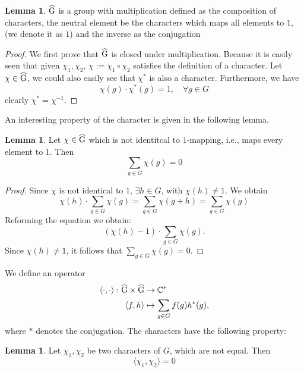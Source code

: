 \documentclass{article}
\theoremstyle{definition}
\newtheorem{lemma}[theorem]{Lemma}
\numberwithin{equation}{theorem}
\numberwithin{figure}{theorem}
\newcommand\reallywidehat[1]{%
\savestack{\tmpbox}{\stretchto{%
  \scaleto{%
    \scalerel*[\widthof{\ensuremath{#1}}]{\kern-.6pt\bigwedge\kern-.6pt}%
    {\rule[-\textheight/2]{1ex}{\textheight}}%
  }{\textheight}%
}{0.5ex}}%
\stackon[1pt]{#1}{\tmpbox}%
}
\newcommand{\ComplexUnit}{\ensuremath{\mathbb{C}^{*}}}
\newcommand{\characterGroup}[1][G]{\ensuremath{\reallywidehat{#1}}}
\newcommand{\bilinearForm}[2]{\ensuremath{\langle#1,#2\rangle}}
\newcommand{\composition}[2]{\ensuremath{#1\circ#2}}
\begin{document}
    \begin{lemma}\label{lem:characterGroupIsAGroup}
        $\characterGroup$ is a group with multiplication defined as the composition of characters, the neutral element
        be the characters which maps all elements to $1$, (we denote it as $1$) and the inverse as the conjugation
    \end{lemma}
    \begin{proof}
        We first prove that $\characterGroup$ is closed under multiplication. Because it is easily seen that 
        given $\chi_1, \chi_2$, $\chi := \composition{\chi_1}{\chi_2}$ satisfies the definition of a character.
        Let $\chi \in \characterGroup$, we could also easily see that $\chi^{*}$ is also a character.
        Furthermore, we have 
        \[\chi(g) \cdot \chi^{*}(g) = 1, \quad \forall g \in G\]
        clearly $\chi^{*} = \chi^{-1}$.
    \end{proof}
    An interesting property of the character is given in the following lemma.
    \begin{lemma}\label{lem:character_1st_Property}
        Let $\chi \in \characterGroup$ which is not identitcal to $1$-mapping, i.e., maps every element to $1$.
        Then
        \[\sum_{g \in G} \chi(g) = 0\]
    \end{lemma}
    \begin{proof}
        Since $\chi$ is not identical to $1$, $\exists h \in G$, with $\chi(h) \neq 1$. We obtain
        \[\chi(h) \cdot \sum_{g\in G}\chi(g) = \sum_{g \in G} \chi(g + h) = \sum_{g \in G} \chi (g)\]
        Reforming the equation we obtain:
        \[(\chi(h) - 1) \cdot \sum_{g \in G} \chi(g).\]
        Since $\chi(h) \neq 1$, it follows that $\sum_{g \in G} \chi(g) = 0$.
    \end{proof}
    We define an operator 
    \begin{align*}
    \bilinearForm{\cdot}{\cdot}: \characterGroup \times \characterGroup &\rightarrow \ComplexUnit\\
    \bilinearForm{f}{h} &\mapsto \sum_{g\in G} f(g) h^{*}(g),
    \end{align*}
    where $*$ denotes the conjugation.
    The characters have the following property:
    \begin{lemma}\label{lem:character_2nd_Sum_Property}
        Let $\chi_1,\chi_2$ be two characters of $G$, which are not equal. Then
        \[\bilinearForm{\chi_1}{\chi_2} = 0\]
    \end{lemma}
\end{document}
